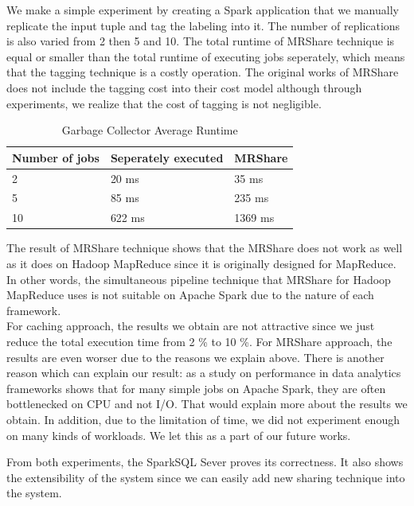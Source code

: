 We make a simple experiment by creating a Spark application that we manually replicate the input tuple and tag the labeling into it. The number of replications is also varied from 2 then 5 and 10. The total runtime of MRShare technique is equal or smaller than the total runtime of executing jobs seperately, which means that the tagging technique is a costly operation. The original works of MRShare does not include the tagging cost into their cost model although through experiments, we realize that the cost of tagging is not negligible.

\begin{table}[]
\centering
\caption{Garbage Collector Average Runtime}
\label{gc-runtime}
\begin{tabular}{|l|l|l|}
\hline
Number of jobs & Seperately executed & MRShare \\ \hline
2              & 20 ms                  & 35 ms    \\ \hline
5              & 85 ms                  & 235 ms    \\ \hline
10             & 622 ms                 & 1369 ms   \\ \hline
\end{tabular}
\end{table}

The result of MRShare technique shows that the MRShare does not work as well as it does on Hadoop MapReduce since it is originally designed for MapReduce. In other words, the simultaneous pipeline technique that MRShare for Hadoop MapReduce uses is not suitable on Apache Spark due to the nature of each framework.\\

For caching approach, the results we obtain are not attractive since we just reduce the total execution time from 2 \% to 10 \%. For MRShare approach, the results are even worser due to the reasons we explain above. There is another reason which can explain our result: as a study on performance in data analytics frameworks \cite{kay2015} shows that for many simple jobs on Apache Spark, they are often bottlenecked on CPU and not I/O. That would explain more about the results we obtain. In addition, due to the limitation of time, we did not experiment enough on many kinds of workloads. We let this as a part of our future works.

From both experiments, the SparkSQL Sever proves its correctness. It also shows the extensibility of the system since we can easily add new sharing technique into the system.
